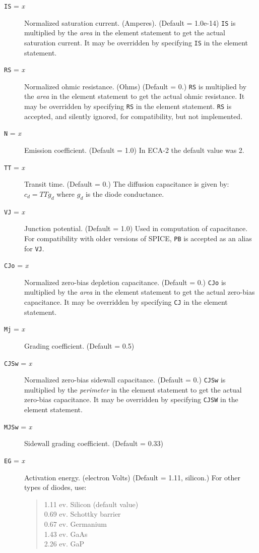 \begin{description}

\item[{\tt IS} = {\it x}] Normalized saturation current. (Amperes).
(Default = 1.0e-14) {\tt IS} is multiplied by the {\it area} in the element
statement to get the actual saturation current.  It may be overridden by
specifying {\tt IS} in the element statement.

\item[{\tt RS} = {\it x}] Normalized ohmic resistance. (Ohms) (Default = 0.)
{\tt RS} is multiplied by the {\it area} in the element statement to get the
actual ohmic resistance.  It may be overridden by specifying {\tt RS} in the
element statement.  {\tt RS} is accepted, and silently ignored, for
compatibility, but not implemented.

\item[{\tt N} = {\it x}] Emission coefficient. (Default = 1.0)
In ECA-2 the default value was 2.

\item[{\tt TT} = {\it x}] Transit time. (Default = 0.)  The diffusion
capacitance is given by: $c_d = TT g_d$ where $g_d$ is the diode
conductance.

\item[{\tt VJ} = {\it x}] Junction potential.  (Default = 1.0) Used in
computation of capacitance.  For compatibility with older versions of SPICE,
{\tt PB} is accepted as an alias for {\tt VJ}.

\item[{\tt CJo} = {\it x}] Normalized zero-bias depletion capacitance.
(Default = 0.)  {\tt CJo} is multiplied by the {\it area} in the element
statement to get the actual zero-bias capacitance.  It may be overridden by
specifying {\tt CJ} in the element statement.

\item[{\tt Mj} = {\it x}] Grading coefficient.  (Default = 0.5)

\item[{\tt CJSw} = {\it x}] Normalized zero-bias sidewall capacitance.
(Default = 0.)  {\tt CJSw} is multiplied by the {\it perimeter} in the
element statement to get the actual zero-bias capacitance.  It may be
overridden by specifying {\tt CJSW} in the element statement.

\item[{\tt MJSw} = {\it x}] Sidewall grading coefficient.  (Default = 0.33)

\item[{\tt EG} = {\it x}] Activation energy. (electron Volts) (Default =
1.11, silicon.)  For other types of diodes, use:
\begin{verse}
1.11 ev.  Silicon (default value)\\
0.69 ev.  Schottky barrier\\
0.67 ev.  Germanium\\
1.43 ev.  GaAs\\
2.26 ev.  GaP
\end{verse}


\end{description}
